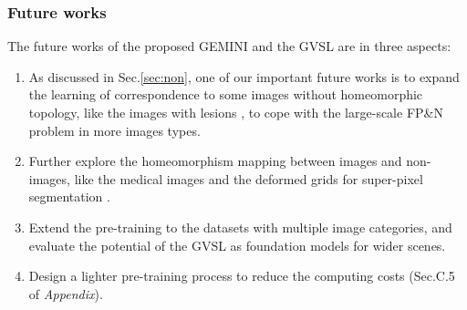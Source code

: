 \subsubsection{Future works}
The future works of the proposed GEMINI and the GVSL are in three aspects:
\begin{enumerate}[leftmargin=*]
  \item As discussed in Sec.\ref{sec:non}, one of our important future works is to expand the learning of correspondence to some images without homeomorphic topology, like the images with lesions \cite{he2021meta}, to cope with the large-scale FP\&N problem in more images types.
  \item Further explore the homeomorphism mapping between images and non-images, like the medical images and the deformed grids for super-pixel segmentation \cite{yang2020superpixel}.
  \item Extend the pre-training to the datasets with multiple image categories, and evaluate the potential of the GVSL as foundation models \cite{liu2024imaging,10750441} for wider scenes.
  \item Design a lighter pre-training process to reduce the computing costs (Sec.C.5 of \emph{Appendix}).
\end{enumerate}


